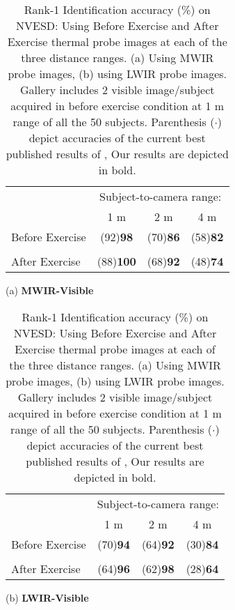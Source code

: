 \documentclass[smallextended,natbib]{svjour3}       \usepackage{graphicx}
\begin{document}
\begin{table}[t]
\begin{minipage}[t]{0.40\textwidth} 
\begin{tabular}{@{}lccc@{}}
\toprule
                                 & \multicolumn{3}{c}{Subject-to-camera range:} \\ \cmidrule(l){2-4} 
                                 & 1 m         & 2 m        & 4 m   \\ \midrule
Before Exercise 	&(92)\textbf{98}			&(70)\textbf{86}				&(58)\textbf{82} \\ 	 
\\
After Exercise             & (88)\textbf{100}              & (68)\textbf{92}             &(48)\textbf{74}                   
\\ \bottomrule
\end{tabular}
\begin{center} (a) \textbf{MWIR-Visible} \end{center}
\end{minipage}
\hfill
\begin{minipage}[t]{0.40\textwidth}
\begin{tabular}{@{}lccc@{}}
\toprule
                                 & \multicolumn{3}{c}{Subject-to-camera range:} \\ \cmidrule(l){2-4} 
                                 & 1 m         & 2 m        & 4 m   \\ \midrule
Before Exercise 	&(70)\textbf{94}			&(64)\textbf{92}				&(30)\textbf{84} \\ 	 
\\
After Exercise             & (64)\textbf{96}              & (62)\textbf{98}             &(28)\textbf{64}                   
\\ \bottomrule
\end{tabular}
\begin{center} (b) \textbf{LWIR-Visible} \end{center}
\end{minipage}
\caption{Rank-1 Identification accuracy (\%) on NVESD: Using Before Exercise and After Exercise thermal probe images at each of the three distance ranges. (a) Using MWIR probe images, (b) using LWIR probe images. Gallery includes 2 visible image/subject acquired in before exercise condition at 1 m range of all the 50 subjects. Parenthesis ($\cdot$) depict accuracies of the current best published results of \cite{hu2015}, Our results are depicted in bold.}
\label{table:3}
\end{table}
\end{document}
